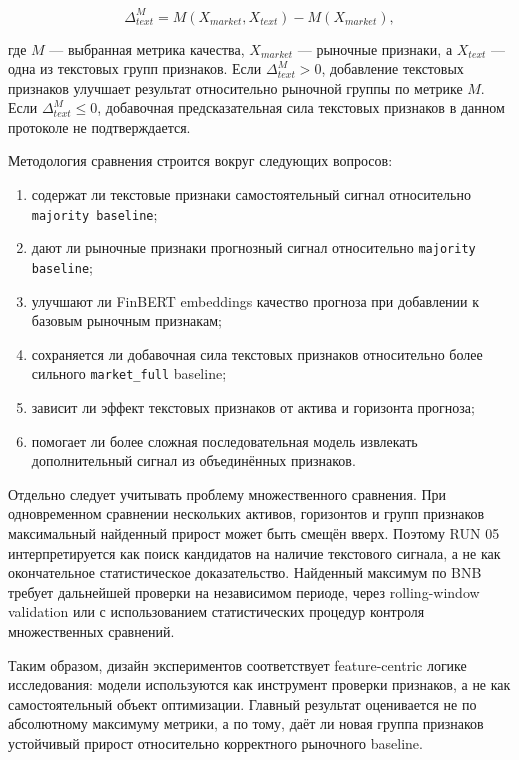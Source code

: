 \[
\Delta_{text}^{M}
=
M(X_{market},X_{text}) - M(X_{market}),
\]

где $M$ --- выбранная метрика качества, $X_{market}$ --- рыночные признаки, а $X_{text}$ --- одна из текстовых групп признаков. Если $\Delta_{text}^{M} > 0$, добавление текстовых признаков улучшает результат относительно рыночной группы по метрике $M$. Если $\Delta_{text}^{M} \leq 0$, добавочная предсказательная сила текстовых признаков в данном протоколе не подтверждается.

Методология сравнения строится вокруг следующих вопросов:

\begin{enumerate}
    \item содержат ли текстовые признаки самостоятельный сигнал относительно \texttt{majority baseline};
    \item дают ли рыночные признаки прогнозный сигнал относительно \texttt{majority baseline};
    \item улучшают ли FinBERT embeddings качество прогноза при добавлении к базовым рыночным признакам;
    \item сохраняется ли добавочная сила текстовых признаков относительно более сильного \texttt{market\_full} baseline;
    \item зависит ли эффект текстовых признаков от актива и горизонта прогноза;
    \item помогает ли более сложная последовательная модель извлекать дополнительный сигнал из объединённых признаков.
\end{enumerate}

Отдельно следует учитывать проблему множественного сравнения. При одновременном сравнении нескольких активов, горизонтов и групп признаков максимальный найденный прирост может быть смещён вверх. Поэтому RUN 05 интерпретируется как поиск кандидатов на наличие текстового сигнала, а не как окончательное статистическое доказательство. Найденный максимум по BNB требует дальнейшей проверки на независимом периоде, через rolling-window validation или с использованием статистических процедур контроля множественных сравнений.

Таким образом, дизайн экспериментов соответствует feature-centric логике исследования: модели используются как инструмент проверки признаков, а не как самостоятельный объект оптимизации. Главный результат оценивается не по абсолютному максимуму метрики, а по тому, даёт ли новая группа признаков устойчивый прирост относительно корректного рыночного baseline.
